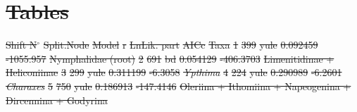 \documentclass[10pt,letterpaper]{article} %
\providecommand{\DIFdel}[1]{{\protect\color{red}\sout{#1}}}                      %
\begin{document}
\section*{\DIFdel{Tables}}
{%
}
\DIFdel{Shift N$^\circ$ }%
\DIFdel{Split.Node }%
\DIFdel{Model }%
\DIFdel{r          }%
\DIFdel{LnLik. part }%
\DIFdel{AICc     }%
\DIFdel{Taxa                                                       }%
\DIFdel{1               }%
\DIFdel{399        }%
\DIFdel{yule  }%
\DIFdel{0.092459   }%
\DIFdel{-1055.957  }%
\DIFdel{Nymphalidae (root)}%
\DIFdel{2               }%
\DIFdel{691        }%
\DIFdel{bd    }%
\DIFdel{0.054129   }%
\DIFdel{-406.3703  }%
\DIFdel{Limenitidinae + Heliconiinae                               }%
\DIFdel{3               }%
\DIFdel{299        }%
\DIFdel{yule  }%
\DIFdel{0.311199   }%
\DIFdel{-6.3058    }%
\emph{\DIFdel{Ypthima}}                                             %
\DIFdel{4               }%
\DIFdel{224        }%
\DIFdel{yule  }%
\DIFdel{0.290989   }%
\DIFdel{-6.2601    }%
\emph{\DIFdel{Charaxes}}                                            %
\DIFdel{5               }%
\DIFdel{750        }%
\DIFdel{yule  }%
\DIFdel{0.186913   }%
\DIFdel{-147.4146  }%
\DIFdel{Oleriina + Ithomiina + Napeogenina + Dircennina + Godyrina }%
\end{document}
